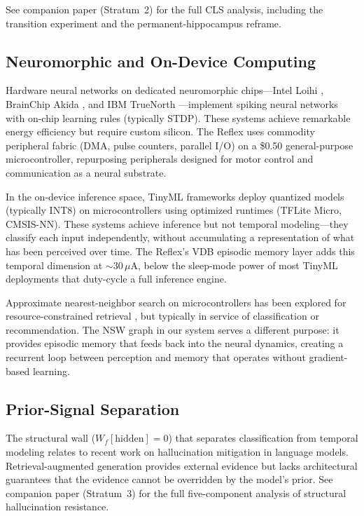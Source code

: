 \documentclass[11pt,letterpaper]{article}
\begin{document}
See companion paper (Stratum~2) for the full CLS analysis, including the transition experiment and the permanent-hippocampus reframe.

\subsection{Neuromorphic and On-Device Computing}

Hardware neural networks on dedicated neuromorphic chips---Intel Loihi \cite{davies2018loihi}, BrainChip Akida \cite{vanschaik2023}, and IBM TrueNorth \cite{merolla2014truenorth}---implement spiking neural networks with on-chip learning rules (typically STDP). These systems achieve remarkable energy efficiency but require custom silicon. The Reflex uses commodity peripheral fabric (DMA, pulse counters, parallel I/O) on a \$0.50 general-purpose microcontroller, repurposing peripherals designed for motor control and communication as a neural substrate.

In the on-device inference space, TinyML frameworks \cite{banbury2021mlperf,warden2019tinyml} deploy quantized models (typically INT8) on microcontrollers using optimized runtimes (TFLite Micro, CMSIS-NN). These systems achieve inference but not temporal modeling---they classify each input independently, without accumulating a representation of what has been perceived over time. The Reflex's VDB episodic memory layer adds this temporal dimension at $\sim$30\,$\mu$A, below the sleep-mode power of most TinyML deployments that duty-cycle a full inference engine.

Approximate nearest-neighbor search on microcontrollers has been explored for resource-constrained retrieval \cite{jegou2011product}, but typically in service of classification or recommendation. The NSW graph in our system serves a different purpose: it provides episodic memory that feeds back into the neural dynamics, creating a recurrent loop between perception and memory that operates without gradient-based learning.

\subsection{Prior-Signal Separation}

The structural wall ($W_f[\text{hidden}] = 0$) that separates classification from temporal modeling relates to recent work on hallucination mitigation in language models. Retrieval-augmented generation \cite{lewis2020rag} provides external evidence but lacks architectural guarantees that the evidence cannot be overridden by the model's prior. See companion paper (Stratum~3) for the full five-component analysis of structural hallucination resistance.
\end{document}
